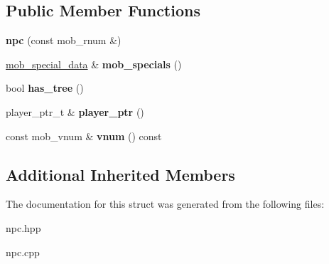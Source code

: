 \subsection*{Public Member Functions}
\begin{DoxyCompactItemize}
\item 
\mbox{\label{structmods_1_1npc_ac5fcdc1394c7100a85e77337eb00b5b6}} 
{\bfseries npc} (const mob\+\_\+rnum \&)
\item 
\mbox{\label{structmods_1_1npc_a1f77a45a636579766a1426db376dfcd6}} 
\hyperlink{structmob__special__data}{mob\+\_\+special\+\_\+data} \& {\bfseries mob\+\_\+specials} ()
\item 
\mbox{\label{structmods_1_1npc_a9a163292067fb1c188a214fa8df9ea17}} 
bool {\bfseries has\+\_\+tree} ()
\item 
\mbox{\label{structmods_1_1npc_a3c371d34bcf446a83087714168bfb3c7}} 
player\+\_\+ptr\+\_\+t \& {\bfseries player\+\_\+ptr} ()
\item 
\mbox{\label{structmods_1_1npc_a6c4b6b657eb545ef8f13935aede72c4d}} 
const mob\+\_\+vnum \& {\bfseries vnum} () const
\end{DoxyCompactItemize}
\subsection*{Additional Inherited Members}


The documentation for this struct was generated from the following files\+:\begin{DoxyCompactItemize}
\item 
npc.\+hpp\item 
npc.\+cpp\end{DoxyCompactItemize}
